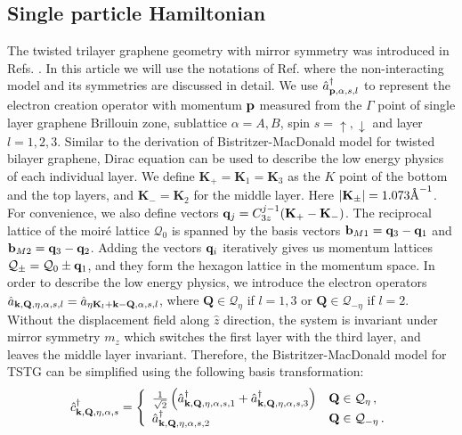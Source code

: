 \documentclass[prb,aps,nofootinbib,amssymb,twocolumn,superscriptaddress,10pt]{revtex4-2}
\begin{document}
\subsection{Single particle Hamiltonian}
The twisted trilayer graphene geometry with mirror symmetry was introduced in Refs. \cite{KHA19,MOR19}. In this article we will use the notations of Ref. \cite{TSTGI,BER20,BER20a,BER20b,LIA20,SON19,SON20b,XIE20a} where the non-interacting model and its symmetries are discussed in detail. We use $\hat{a}^\dagger_{\mathbf{p}, \alpha, s, l}$ to represent the electron creation operator with momentum $\mathbf{p}$ measured from the $\Gamma$ point of single layer graphene Brillouin zone, sublattice $\alpha=A, B$, spin $s=\uparrow, \downarrow$ and layer $l=1,2,3$. Similar to the derivation of Bistritzer-MacDonald model for twisted bilayer graphene, Dirac equation can be used to describe the low energy physics of each individual layer. We define $\mathbf{K}_+ = \mathbf{K}_1 = \mathbf{K}_3$ as the $K$ point of the bottom and the top layers, and $\mathbf{K}_- = \mathbf{K}_2$ for the middle layer. Here $|\mathbf{K}_\pm |= 1.073\textrm{\r{A}}^{-1}$. For convenience, we also define vectors $\mathbf{q}_j = C_{3z}^{j-1}(\mathbf{K}_+ - \mathbf{K}_-)$. The reciprocal lattice of the moir\'e lattice $\mathcal{Q}_0$ is spanned by the basis vectors $\mathbf{b}_{M1} = \mathbf{q}_3 - \mathbf{q}_1$ and $\mathbf{b}_{M2} = \mathbf{q}_3 - \mathbf{q}_2$. Adding the vectors $\mathbf{q}_i$ iteratively gives us momentum lattices $\mathcal{Q}_\pm = \mathcal{Q}_0 \pm \mathbf{q} _1$, and they form the hexagon lattice in the momentum space. In order to describe the low energy physics, we introduce the electron operators $\hat{a}_{\mathbf{k}, \mathbf{Q}, \eta, \alpha, s, l} = \hat{a}_{\eta\mathbf{K}_l + \mathbf{k} -\mathbf{Q}, \alpha, s, l}$, where $\mathbf{Q}\in\mathcal{Q}_{\eta}$ if $l = 1,3$ or $\mathbf{Q}\in\mathcal{Q}_{-\eta}$ if $l=2$. Without the displacement field along $\hat{z}$ direction, the system is invariant under mirror symmetry $m_z$ which switches the first layer with the third layer, and leaves the middle layer invariant. Therefore, the Bistritzer-MacDonald model for TSTG can be simplified using the following basis transformation:
\begin{align}
	\hat{c}^\dagger_{\mathbf{k}, \mathbf{Q}, \eta, \alpha, s} = \left\{
		\begin{array}{ll}
			\frac{1}{\sqrt2} \left(\hat{a}^\dagger_{\mathbf{k}, \mathbf{Q}, \eta, \alpha, s, 1} + \hat{a}^\dagger_{\mathbf{k}, \mathbf{Q}, \eta, \alpha, s, 3}\right)	& \mathbf{Q} \in \mathcal{Q}_\eta\,,\\
			\hat{a}^\dagger_{\mathbf{k}, \mathbf{Q}, \eta, \alpha, s, 2} & \mathbf{Q} \in \mathcal{Q}_{-\eta}\,.
		\end{array}
	\right.\label{eqn:def_even_sector}
\end{align}
\end{document}
